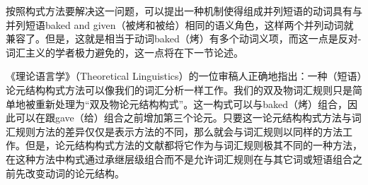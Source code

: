     按照构式方法要解决这一问题，可以提出一种机制使得组成并列短语的动词具有与并列短语baked and given（被烤和被给）相同的语义角色，这样两个并列动词就兼容了。但是，这就是相当于动词baked（烤）有多个动词义项，而这一点是反对-词汇主义的学者极力避免的，这一点将在下一节论述。

    《理论语言学》（Theoretical Linguistics）的一位审稿人正确地指出：一种（短语）论元结构构式方法可以像我们的词汇分析一样工作。我们的双及物词汇规则只是简单地被重新处理为“双及物论元结构构式”。这一构式可以与baked（烤）组合，因此可以在跟gave（给）组合之前增加第三个论元。只要这一论元结构构式方法与词汇规则方法的差异仅仅是表示方法的不同，那么就会与词汇规则以同样的方法工作。但是，论元结构构式方法的文献都将它作为与词汇规则极其不同的一种方法，在这种方法中构式通过承继层级组合而不是允许词汇规则在与其它词或短语组合之前先改变动词的论元结构。
